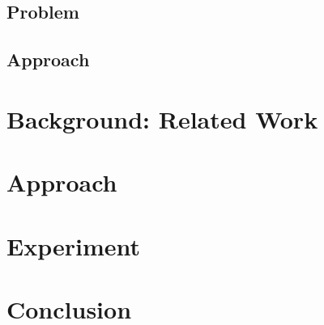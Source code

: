 \documentclass[12pt,twoside]{article}
\begin{document}
\subsection{Problem}

\subsection{Approach}

\section{Background: Related Work}

\section{Approach}

\section{Experiment}

\section{Conclusion}



\pagebreak

\printbibliography
\end{document}
